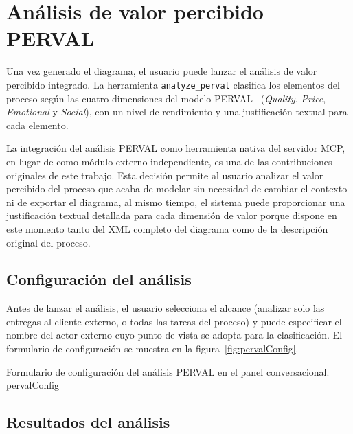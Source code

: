 \section{Análisis de valor percibido PERVAL}
\label{sec:demoPerval}

Una vez generado el diagrama, el usuario puede lanzar el análisis de valor percibido integrado. La herramienta \texttt{analyze\_perval} clasifica los elementos del proceso según las cuatro dimensiones del modelo PERVAL~\cite{sweeney2001perval} (\textit{Quality}, \textit{Price}, \textit{Emotional} y \textit{Social}), con un nivel de rendimiento y una justificación textual para cada elemento.

La integración del análisis PERVAL como herramienta nativa del servidor MCP, en lugar de como módulo externo independiente, es una de las contribuciones originales de este trabajo. Esta decisión permite al usuario analizar el valor percibido del proceso que acaba de modelar sin necesidad de cambiar el contexto ni de exportar el diagrama, al mismo tiempo, el sistema puede proporcionar una justificación textual detallada para cada dimensión de valor porque dispone en este momento tanto del XML completo del diagrama como de la descripción original del proceso. 

\subsection{Configuración del análisis}
\label{subsec:demoPervalConfig}

Antes de lanzar el análisis, el usuario selecciona el alcance (analizar solo las entregas al cliente externo, o todas las tareas del proceso) y puede especificar el nombre del actor externo cuyo punto de vista se adopta para la clasificación. El formulario de configuración se muestra en la figura~\ref{fig:pervalConfig}.

%
  {Formulario de configuración del análisis PERVAL en el panel conversacional.}%
  {pervalConfig}

\subsection{Resultados del análisis}
\label{subsec:demoPervalResultados}

